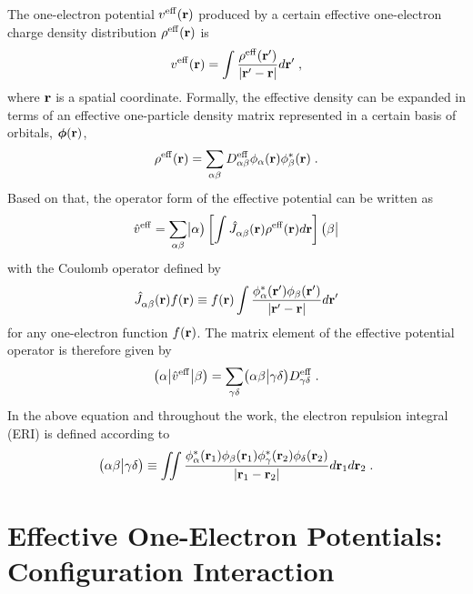 The one\hyp{}electron potential $v^{\rm eff}({\bf r})$
produced by a certain effective one\hyp{}electron charge density distribution $\rho^{\rm eff}({\bf r})$
is 
%
\begin{equation}
	v^{\rm eff}({\bf r}) = \int \frac{ \rho^{\rm eff}({\bf r}') }{ \vert {\bf r}' - {\bf r} \vert} d{\bf r}' \;,
\end{equation}
%
where ${\bf r}$ is a spatial coordinate. Formally, the effective density can be expanded in terms of an effective
one\hyp{}particle density matrix represented in a certain basis of orbitals, $\bm{\phi}({\bf r})$,
%
\begin{equation}
	\rho^{\rm eff}({\bf r}) = \sum_{\alpha\beta} D_{\alpha\beta}^{\rm eff} 
	\phi_\alpha({\bf r}) \phi_\beta^{*}({\bf r})  \;.
\end{equation}
%
Based on that, the operator form of the effective potential 
can be written as
%
\begin{equation}
	\hat{v}^{\rm eff} = \sum_{\alpha\beta} 
	\bigr\rvert {\alpha} \bigr) 
	\left[
	\int
	\hat{J}^{\rm}_{\alpha\beta}({\bf r}) 
	\rho^{\rm eff}({\bf r})
	d{\bf r} 
	\right]
	\bigl( {\beta} \bigl\lvert  
\end{equation}
%
with the Coulomb operator defined by
%
\begin{equation}
	\hat{J}^{\rm}_{\alpha\beta}({\bf r}) f({\bf r}) \equiv
	f({\bf r}) 
	\int
	\frac{ \phi_\alpha^{*}({\bf r}') \phi_\beta({\bf r}') }{ \vert {\bf r}' - {\bf r} \vert} d{\bf r}'
\end{equation}
%
for any one\hyp{}electron function $f({\bf r})$. The matrix element of the effective potential operator
is therefore given by
%
\begin{equation}
	\bigl( {\alpha} \bigl\lvert { \hat{v}^{\rm eff} } \bigl\lvert {\beta} \bigr)
	= \sum_{\gamma\delta} \bigl( {\alpha\beta} \bigl\lvert {\gamma\delta} \bigr) D^{\rm eff}_{\gamma\delta}  \;.
\end{equation}
%
In the above equation and throughout the work, the electron repulsion integral (ERI)
is defined according to
%
\begin{equation}
	\bigl( {\alpha\beta} \bigl\lvert {\gamma\delta} \bigr) \equiv
	\iint 
	\frac{ \phi_\alpha^{*}({\bf r}_1) \phi_\beta({\bf r}_1) 
	       \phi_\gamma^{*}({\bf r}_2) \phi_\delta({\bf r}_2) }{ \vert {\bf r}_1 - {\bf r}_2 \vert}
	d{\bf r}_1 d{\bf r}_2  \;.
\end{equation}
%


\section{\label{s:2}Effective One-Electron Potentials: Configuration Interaction}

